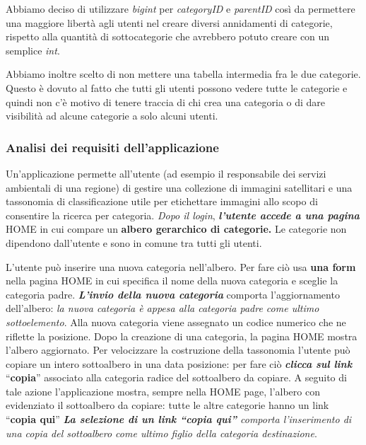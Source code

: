 Abbiamo deciso di utilizzare \emph{bigint} per \emph{categoryID} e
\emph{parentID} così da permettere una maggiore libertà agli utenti nel
creare diversi annidamenti di categorie, rispetto alla quantità di
sottocategorie che avrebbero potuto creare con un semplice \emph{int}.

Abbiamo inoltre scelto di non mettere una tabella intermedia fra le due
categorie. Questo è dovuto al fatto che tutti gli utenti possono vedere
tutte le categorie e quindi non c'è motivo di tenere traccia di chi crea
una categoria o di dare visibilità ad alcune categorie a solo alcuni
utenti.

\pagebreak

\hypertarget{analisi-dei-requisiti-dellapplicazione}{%
\subsubsection{Analisi dei requisiti
dell'applicazione}\label{analisi-dei-requisiti-dellapplicazione}}

Un'applicazione permette all'utente (ad esempio il responsabile dei
servizi ambientali di una regione) di gestire una collezione di immagini
satellitari e una tassonomia di classificazione utile per etichettare
immagini allo scopo di consentire la ricerca per categoria. \emph{Dopo
il login}, \textbf{\emph{l'utente accede a una pagina}} HOME in cui
compare un \textbf{albero gerarchico di categorie.} Le categorie non
dipendono dall'utente e sono in comune tra tutti gli utenti.

L'utente può inserire una nuova categoria nell'albero. Per fare ciò usa
\textbf{una form} nella pagina HOME in cui specifica il nome della nuova
categoria e sceglie la categoria padre. \textbf{\emph{L'invio della
nuova categoria}} comporta l'aggiornamento dell'albero: \emph{la nuova
categoria è appesa alla categoria padre come ultimo sottoelemento}. Alla
nuova categoria viene assegnato un codice numerico che ne riflette la
posizione. Dopo la creazione di una categoria, la pagina HOME mostra
l'albero aggiornato. Per velocizzare la costruzione della tassonomia
l'utente può copiare un intero sottoalbero in una data posizione: per
fare ciò \textbf{\emph{clicca sul link}} ``\textbf{copia}'' associato
alla categoria radice del sottoalbero da copiare. A seguito di tale
azione l'applicazione mostra, sempre nella HOME page, l'albero con
evidenziato il sottoalbero da copiare: tutte le altre categorie hanno un
link ``\textbf{copia qui}'' \emph{\textbf{La selezione di un link
``copia qui''} comporta l'inserimento di una copia del sottoalbero come
ultimo figlio della categoria destinazione}.

